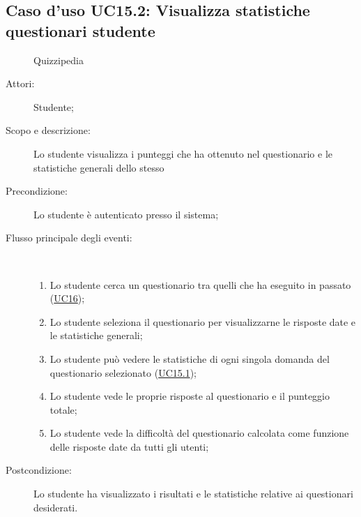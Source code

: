 \subsection{Caso d'uso UC15.2: Visualizza statistiche questionari studente}
	\begin{figure}[H]
		\centering
		\begin{resizedtikzpicture}{\textwidth}
		\begin{umlsystem}[x=0, fill=lightgray!20]{Quizzipedia}
		\end{umlsystem}
		\end{resizedtikzpicture}
		\caption{}
	\end{figure}
\begin{description}
\item[Attori:] Studente;
\item[Scopo e descrizione:] Lo studente visualizza i punteggi che ha ottenuto nel questionario e le statistiche generali dello stesso
      \item[Precondizione:] Lo studente è autenticato presso il sistema;

        \item[Flusso principale degli eventi:] \ 
 \begin{enumerate}
          \item Lo studente cerca un questionario tra quelli che ha eseguito in passato (\hyperlink{UC16}{UC16});
          \item Lo studente seleziona il questionario per visualizzarne le risposte date e le statistiche generali;
          \item Lo studente può vedere le statistiche di ogni singola domanda del questionario selezionato (\hyperlink{UC15.1}{UC15.1});
          \item Lo studente vede le proprie risposte al questionario e il punteggio totale;
          \item Lo studente vede la difficoltà del questionario calcolata come funzione delle risposte date da tutti gli utenti;

      \end{enumerate}
    \item[Postcondizione:] Lo studente ha visualizzato i risultati e le statistiche relative ai questionari desiderati.
  \end{description}
\hypertarget{UC15.3}{}
